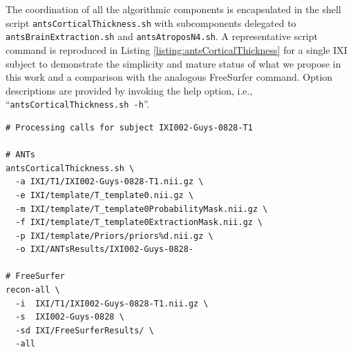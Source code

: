 The coordination of all the algorithmic components is
encapsulated in the shell script {\tt antsCorticalThickness.sh} with
subcomponents delegated to {\tt antsBrainExtraction.sh} 
and {\tt antsAtroposN4.sh}.  A representative script command 
is reproduced in Listing \ref{listing:antsCorticalThickness} for
a single IXI subject to demonstrate the simplicity and
mature status of what we propose in this work and a comparison
with the analogous FreeSurfer command.  
Option descriptions are provided by invoking the
help option, i.e., ``{\tt antsCorticalThickness.sh -h}''.

\begin{lstlisting}
# Processing calls for subject IXI002-Guys-0828-T1

# ANTs
antsCorticalThickness.sh \
  -a IXI/T1/IXI002-Guys-0828-T1.nii.gz \
  -e IXI/template/T_template0.nii.gz \
  -m IXI/template/T_template0ProbabilityMask.nii.gz \
  -f IXI/template/T_template0ExtractionMask.nii.gz \  
  -p IXI/template/Priors/priors%d.nii.gz \
  -o IXI/ANTsResults/IXI002-Guys-0828-

# FreeSurfer  
recon-all \
  -i  IXI/T1/IXI002-Guys-0828-T1.nii.gz \
  -s  IXI002-Guys-0828 \
  -sd IXI/FreeSurferResults/ \
  -all
\end{lstlisting}

